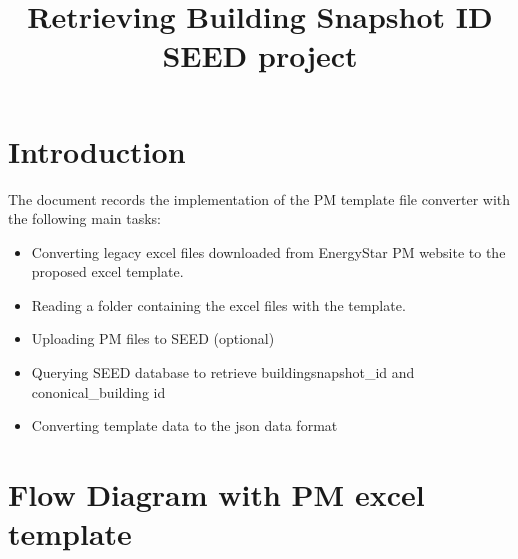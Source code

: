 \documentclass[12pt]{article}
\begin{document}
\title{Retrieving Building Snapshot ID\\
       \large SEED project}
\maketitle
\tableofcontents
\newpage
\section{Introduction}\label{sec:intro}
The document records the implementation of the PM template file
converter with the following main tasks:
\begin{itemize}
\item Converting legacy excel files downloaded from EnergyStar PM
  website to the proposed excel template.
\item Reading a folder containing the excel files with the template.
\item Uploading PM files to SEED (optional)
\item Querying SEED database to retrieve buildingsnapshot\_id and
  cononical\_building id
\item Converting template data to the json data format
\end{itemize}

\section{Flow Diagram with PM excel template}\label{sec:outline}
\end{document}
